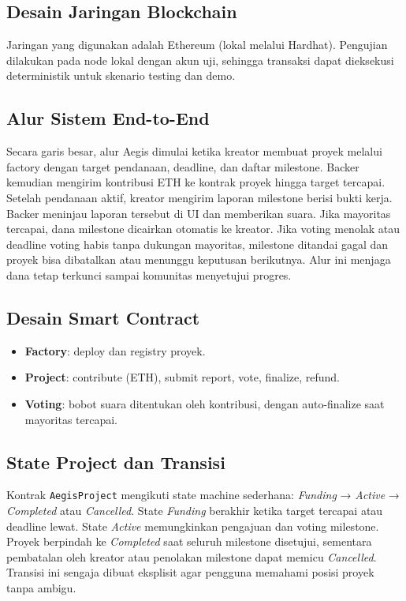 \documentclass[12pt]{article}
\begin{document}
\subsection{Desain Jaringan Blockchain}
Jaringan yang digunakan adalah Ethereum (lokal melalui Hardhat). Pengujian dilakukan pada node lokal dengan akun uji, sehingga transaksi dapat dieksekusi deterministik untuk skenario testing dan demo.

\subsection{Alur Sistem End-to-End}
Secara garis besar, alur Aegis dimulai ketika kreator membuat proyek melalui factory dengan target pendanaan, deadline, dan daftar milestone. Backer kemudian mengirim kontribusi ETH ke kontrak proyek hingga target tercapai. Setelah pendanaan aktif, kreator mengirim laporan milestone berisi bukti kerja. Backer meninjau laporan tersebut di UI dan memberikan suara. Jika mayoritas tercapai, dana milestone dicairkan otomatis ke kreator. Jika voting menolak atau deadline voting habis tanpa dukungan mayoritas, milestone ditandai gagal dan proyek bisa dibatalkan atau menunggu keputusan berikutnya. Alur ini menjaga dana tetap terkunci sampai komunitas menyetujui progres.

\subsection{Desain Smart Contract}
\begin{itemize}[leftmargin=1.2em]
  \item \textbf{Factory}: deploy dan registry proyek.
  \item \textbf{Project}: contribute (ETH), submit report, vote, finalize, refund.
  \item \textbf{Voting}: bobot suara ditentukan oleh kontribusi, dengan auto-finalize saat mayoritas tercapai.
\end{itemize}

\subsection{State Project dan Transisi}
Kontrak \texttt{AegisProject} mengikuti state machine sederhana: \textit{Funding} → \textit{Active} → \textit{Completed} atau \textit{Cancelled}. State \textit{Funding} berakhir ketika target tercapai atau deadline lewat. State \textit{Active} memungkinkan pengajuan dan voting milestone. Proyek berpindah ke \textit{Completed} saat seluruh milestone disetujui, sementara pembatalan oleh kreator atau penolakan milestone dapat memicu \textit{Cancelled}. Transisi ini sengaja dibuat eksplisit agar pengguna memahami posisi proyek tanpa ambigu.
\end{document}
